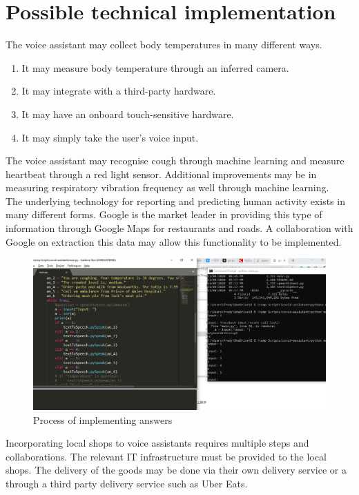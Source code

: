 \documentclass{article}
\begin{document}
\section*{Possible technical implementation}
The voice assistant may collect body temperatures in many different ways. 

\begin{enumerate}
    \item It may measure body temperature through an inferred camera.
    \item It may integrate with a third-party hardware.
    \item It may have an onboard touch-sensitive hardware.
    \item It may simply take the user’s voice input.
\end{enumerate}

The voice assistant may recognise cough through machine learning and measure heartbeat through a red light sensor. Additional improvements may be in measuring respiratory vibration frequency as well through machine learning.\\

The underlying technology for reporting and predicting human activity exists in many different forms. Google is the market leader in providing this type of information through Google Maps for restaurants and roads. A collaboration with Google on extraction this data may allow this functionality to be implemented.\\

\begin{figure}
        \centering
        \includegraphics[scale=0.32]{image.png}
        \caption{Process of implementing answers}
        \label{fig:GD}
\end{figure}

Incorporating local shops to voice assistants requires multiple steps and collaborations. The relevant IT infrastructure must be provided to the local shops. The delivery of the goods may be done via their own delivery service or a through a third party delivery service such as Uber Eats.
\end{document}
